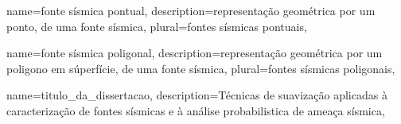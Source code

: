 {
	name={fonte sísmica pontual},
	description={representação geométrica por um ponto, de uma fonte sísmica},
	plural={fontes sísmicas pontuais},
}


{
	name={fonte sísmica poligonal},
	description={representação geométrica por um poligono em súperfície, 
				 de uma fonte sísmica},
	plural={fontes sísmicas poligonais},
}

{
	name={titulo_da_dissertacao},
	description={Técnicas de suavização aplicadas
					à caracterização de fontes sísmicas e 
					à análise probabilistica de ameaça sísmica},
}


